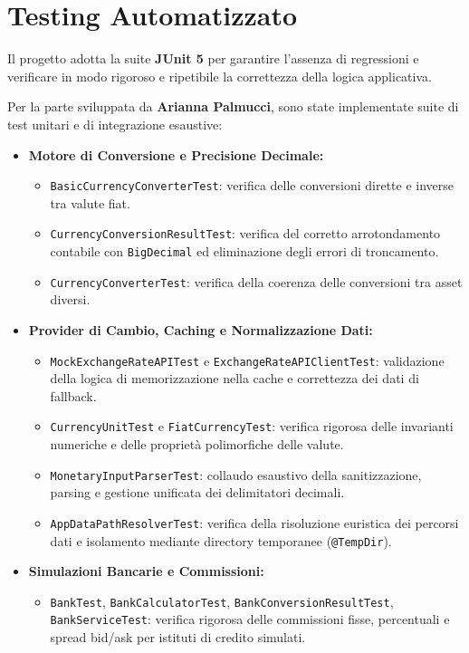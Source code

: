 \documentclass[11pt,a4paper,openright]{report}
\begin{document}
\section{Testing Automatizzato}
Il progetto adotta la suite \textbf{JUnit 5} per garantire l'assenza di regressioni e verificare in modo rigoroso e ripetibile la correttezza della logica applicativa.

Per la parte sviluppata da \textbf{Arianna Palmucci}, sono state implementate suite di test unitari e di integrazione esaustive:
\begin{itemize}
  \item \textbf{Motore di Conversione e Precisione Decimale:}
  \begin{itemize}
    \item \texttt{BasicCurrencyConverterTest}: verifica delle conversioni dirette e inverse tra valute fiat.
    \item \texttt{CurrencyConversionResultTest}: verifica del corretto arrotondamento contabile con \texttt{BigDecimal} ed eliminazione degli errori di troncamento.
    \item \texttt{CurrencyConverterTest}: verifica della coerenza delle conversioni tra asset diversi.
  \end{itemize}
  \item \textbf{Provider di Cambio, Caching e Normalizzazione Dati:}
  \begin{itemize}
    \item \texttt{MockExchangeRateAPITest} e \texttt{ExchangeRateAPIClientTest}: validazione della logica di memorizzazione nella cache e correttezza dei dati di fallback.
    \item \texttt{CurrencyUnitTest} e \texttt{FiatCurrencyTest}: verifica rigorosa delle invarianti numeriche e delle proprietà polimorfiche delle valute.
    \item \texttt{MonetaryInputParserTest}: collaudo esaustivo della sanitizzazione, parsing e gestione unificata dei delimitatori decimali.
    \item \texttt{AppDataPathResolverTest}: verifica della risoluzione euristica dei percorsi dati e isolamento mediante directory temporanee (\texttt{@TempDir}).
  \end{itemize}
  \item \textbf{Simulazioni Bancarie e Commissioni:}
  \begin{itemize}
    \item \texttt{BankTest}, \texttt{BankCalculatorTest}, \texttt{BankConversionResultTest}, \texttt{BankServiceTest}: verifica rigorosa delle commissioni fisse, percentuali e spread bid/ask per istituti di credito simulati.

\end{itemize}
\end{itemize}
\end{document}
